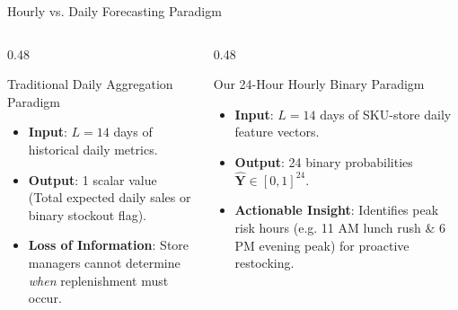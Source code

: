 \documentclass[10pt, aspectratio=169]{beamer}
\begin{document}
\begin{frame}{Hourly vs. Daily Forecasting Paradigm}
  \begin{columns}[T]
    \begin{column}{0.48\textwidth}
      \begin{alertblock}{Traditional Daily Aggregation Paradigm}
        \begin{itemize}
          \item \textbf{Input}: $L=14$ days of historical daily metrics.
          \item \textbf{Output}: 1 scalar value (Total expected daily sales or binary stockout flag).
          \item \textbf{Loss of Information}: Store managers cannot determine \emph{when} replenishment must occur.
        \end{itemize}
      \end{alertblock}
    \end{column}
    
    \begin{column}{0.48\textwidth}
      \begin{exampleblock}{Our 24-Hour Hourly Binary Paradigm}
        \begin{itemize}
          \item \textbf{Input}: $L=14$ days of SKU-store daily feature vectors.
          \item \textbf{Output}: 24 binary probabilities $\hat{\mathbf{Y}} \in [0, 1]^{24}$.
          \item \textbf{Actionable Insight}: Identifies peak risk hours (e.g. 11 AM lunch rush \& 6 PM evening peak) for proactive restocking.
        \end{itemize}
      \end{exampleblock}
    \end{column}
  \end{columns}
\end{frame}
\end{document}
